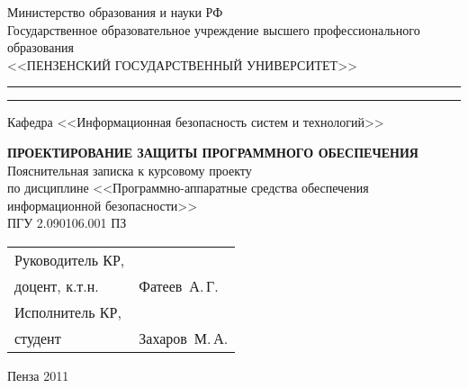\newpage
\begin{center}
  \begin{singlespace}
    Министерство образования и науки РФ  \\
    Государственное образовательное учреждение высшего профессионального образования \\
    \vspace{0.25cm}
    <<ПЕНЗЕНСКИЙ ГОСУДАРСТВЕННЫЙ УНИВЕРСИТЕТ>> \\
    \medskip 
    \hrule height 1pt
    \vskip 1pt 
    \hrule
    \vskip 3pt
    Кафедра <<Информационная безопасность систем и технологий>>
  \end{singlespace}

  \vspace{8em}

  \textsc{\textbf{ПРОЕКТИРОВАНИЕ ЗАЩИТЫ ПРОГРАММНОГО ОБЕСПЕЧЕНИЯ}}\\[0.5cm]

  Пояснительная записка к курсовому проекту \\
  по дисциплине <<Программно-аппаратные средства обеспечения информационной безопасности>>\\[0.5cm]

  ПГУ 2.090106.001 ПЗ

  \vspace{8em}

  \begin{tabular}[h]{p{7cm}l}
    Руководитель КР,  & \\
    доцент, к.т.н. & \underline{\hspace{3cm}}Фатеев~А.\,Г.\\
    Исполнитель КР,  & \\
    студент & \underline{\hspace{3cm}}Захаров~М.\,А.
  \end{tabular}

  \vspace{\fill}

  Пенза 2011

\end{center}
\newpage
